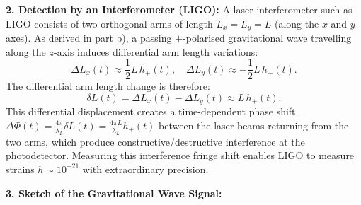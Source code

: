 \documentclass[12pt]{article}
\begin{document}
\begin{enumerate}[label=\alph*)]
\vspace{0.8em}
\noindent\textbf{2. Detection by an Interferometer (LIGO):}
A laser interferometer such as LIGO consists of two orthogonal arms of length $L_x = L_y = L$ (along the $x$ and $y$ axes). 
As derived in part b), a passing $+$-polarised gravitational wave travelling along the $z$-axis induces differential arm length variations:
\begin{equation}
\Delta L_x(t) \approx \frac{1}{2} L \, h_+(t), \quad \Delta L_y(t) \approx - \frac{1}{2} L \, h_+(t).
\end{equation}
The differential arm length change is therefore:
\begin{equation}
\delta L(t) = \Delta L_x(t) - \Delta L_y(t) \approx L \, h_+(t).
\end{equation}
This differential displacement creates a time-dependent phase shift $\Delta\Phi(t) = \frac{4\pi}{\lambda_L} \delta L(t) = \frac{4\pi L}{\lambda_L} h_+(t)$ between the laser beams returning from the two arms, which produce constructive/destructive interference at the photodetector. Measuring this interference fringe shift enables LIGO to measure strains $h \sim 10^{-21}$ with extraordinary precision.

\vspace{0.8em}
\noindent\textbf{3. Sketch of the Gravitational Wave Signal:}

\begin{center}
\end{center}
\end{enumerate}
\end{document}
